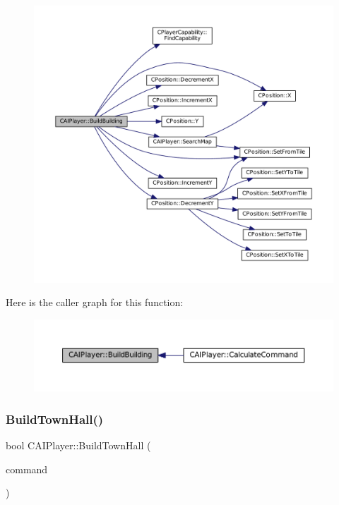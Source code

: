 \begin{figure}[H]
\begin{center}
\leavevmode
\includegraphics[width=350pt]{classCAIPlayer_a2ff5263cbaa6bfc62ffec4dbce87ba88_cgraph}
\end{center}
\end{figure}
Here is the caller graph for this function\+:
\nopagebreak
\begin{figure}[H]
\begin{center}
\leavevmode
\includegraphics[width=350pt]{classCAIPlayer_a2ff5263cbaa6bfc62ffec4dbce87ba88_icgraph}
\end{center}
\end{figure}
\hypertarget{classCAIPlayer_a41cdefbe14210fb70b793a32778c5141}{}\label{classCAIPlayer_a41cdefbe14210fb70b793a32778c5141} 
\subsubsection{\texorpdfstring{Build\+Town\+Hall()}{BuildTownHall()}}
{\footnotesize\ttfamily bool C\+A\+I\+Player\+::\+Build\+Town\+Hall (\begin{DoxyParamCaption}\item[{\hyperlink{structSPlayerCommandRequest}{S\+Player\+Command\+Request} \&}]{command }\end{DoxyParamCaption})\hspace{0.3cm}{\ttfamily [protected]}}



